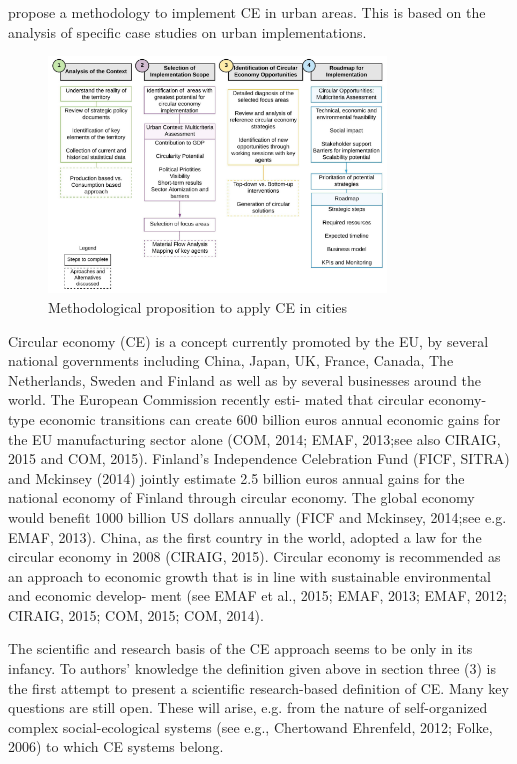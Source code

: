 \textcite{Levoso2019} propose a methodology to implement CE in urban areas. This is based on the analysis of specific case studies on urban implementations.

\begin{figure}[h!]
    \centering
    \includegraphics[width=0.8\textwidth]{sections/asset/ce_in_cities.PNG}
    \caption{Methodological proposition to apply CE in cities}
    \label{fig:ce_application}
\end{figure}


\parencite{Korhonen2018a}
Circular economy (CE) is a concept currently promoted by the EU, by several national governments including China, Japan, UK, France, Canada, The Netherlands, Sweden and Finland as well as by several businesses around the world. The European Commission recently esti- mated that circular economy-type economic transitions can create 600 billion euros annual economic gains for the EU manufacturing sector alone (COM, 2014; EMAF, 2013;see also CIRAIG, 2015 and COM, 2015). Finland's Independence Celebration Fund (FICF, SITRA) and Mckinsey (2014) jointly estimate 2.5 billion euros annual gains for the national economy of Finland through circular economy. The global economy would benefit 1000 billion US dollars annually (FICF and Mckinsey, 2014;see e.g. EMAF, 2013). China, as the first country in the world, adopted a law for the circular economy in 2008 (CIRAIG, 2015). Circular economy is recommended as an approach to economic growth that is in line with sustainable environmental and economic develop- ment (see EMAF et al., 2015; EMAF, 2013; EMAF, 2012; CIRAIG, 2015; COM, 2015; COM, 2014).


The scientific and research basis of the CE approach seems to be only in its infancy. To authors' knowledge the definition given above in section three (3) is the first attempt to present a scientific research-based definition of CE. Many key questions are still open. These will arise, e.g. from the nature of self-organized complex social-ecological systems (see e.g., Chertowand Ehrenfeld, 2012; Folke, 2006) to which CE systems belong.


